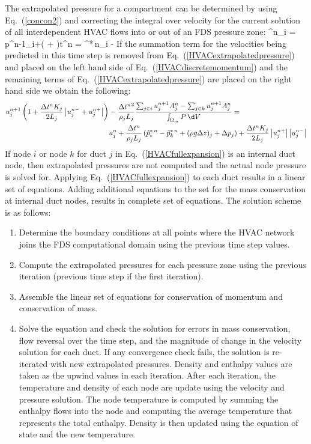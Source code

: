The extrapolated pressure for a compartment can be determined by using Eq.~(\ref{concon2}) and correcting the integral over velocity for the current solution of
all interdependent HVAC flows into or out of an FDS pressure zone:
\be {}^n_i  = p^{n-1}_i+\left( + \right)\Delta t^n = ^{*\,n}_i - 
   \label{HVACextrapolatedpressure} \ee
If the summation term for the velocities being predicted in this time step is removed from Eq.~(\ref{HVACextrapolatedpressure}) and placed on the left hand side of Eq.~(\ref{HVACdiscretemomentum}) and the remaining terms of Eq.~(\ref{HVACextrapolatedpressure}) are placed on the right hand side we obtain the following:
\begin{align}
   u^{n+1}_j \left( 1+\frac{\Delta t^n K_j}{2 L_j} \left| u^{n-}_j+u^{n+}_j \right| \right) &-
    \frac{\Delta {t^n}^2}{\rho_j L_j} \frac{{\sum_{j\in i} u^{n+1}_j A^n_j}-{\sum_{j\in k} u^{n+1}_j A^n_j}}{{\int_{\Omega_m} P \, \d V}}= \nonumber \\
  & u^{n}_j+ \frac{\Delta t^n}{\rho_j L_j}
  \left(\tilde{p}^{*\,n}_i-\tilde{p}^{*\,n}_k +  (\rho g \Delta z)_j + \Delta p_j \right) +
  \frac{\Delta t^n K_j}{2 L_j}\left|u^{n+}_j\right| \left|u^{n-}_j\right| \label{HVACfullexpansion}
\end{align}
If node $i$ or node $k$ for duct $j$ in Eq.~(\ref{HVACfullexpansion}) is an internal duct node, then extrapolated pressures are not computed and the actual node pressure is solved for.
Applying Eq.~(\ref{HVACfullexpansion}) to each duct results in a linear set of equations.
Adding additional equations to the set for the mass conservation at internal duct nodes, results in complete set of equations.
The solution scheme is as follows:

\begin{enumerate}
\item Determine the boundary conditions at all points where the HVAC network joins the FDS computational domain using the previous time step values.
\item Compute the extrapolated pressures for each pressure zone using the previous iteration (previous time step if the first iteration).
\item Assemble the linear set of equations for conservation of momentum and conservation of mass.
\item Solve the equation and check the solution for errors in mass conservation, flow reversal over the time step, and the magnitude of change in the velocity solution for each duct.  If any convergence check fails, the solution is re-iterated with new extrapolated pressures.  Density and enthalpy values are taken as the upwind values in each iteration.  After each iteration, the temperature and density of each node are update using the velocity and pressure solution.  The node temperature is computed by summing the enthalpy flows into the node and computing the average temperature that represents the total enthalpy.  Density is then updated using the equation of state and the new temperature.
\end{enumerate}

